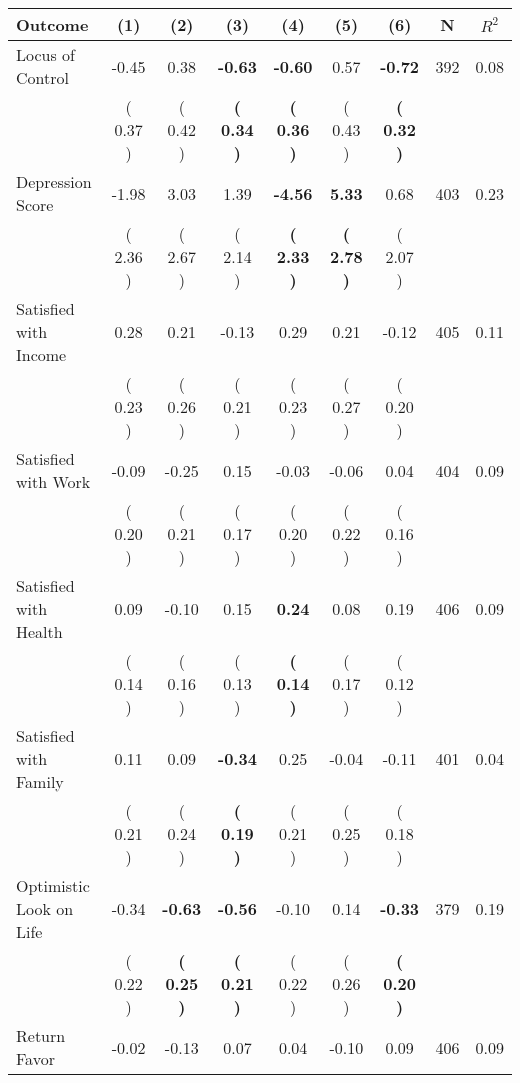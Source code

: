\begin{tabular}{lcccccccc}
\toprule
 \textbf{Outcome} & \textbf{(1)} & \textbf{(2)} & \textbf{(3)} & \textbf{(4)} & \textbf{(5)} & \textbf{(6)} & \textbf{N} & \textbf{$ R^2$} \\
\midrule
Locus of Control &     -0.45 &      0.38 & \textbf{    -0.63} & \textbf{    -0.60} &      0.57 & \textbf{    -0.72} & 392 &       0.08 \\ 
 & (     0.37 ) & (     0.42 ) & \textbf{(     0.34 )} & \textbf{(     0.36 )} & (     0.43 ) & \textbf{(     0.32 )} & \\
Depression Score &     -1.98 &      3.03 &      1.39 & \textbf{    -4.56} & \textbf{     5.33} &      0.68 & 403 &       0.23 \\ 
 & (     2.36 ) & (     2.67 ) & (     2.14 ) & \textbf{(     2.33 )} & \textbf{(     2.78 )} & (     2.07 ) & \\
Satisfied with Income &      0.28 &      0.21 &     -0.13 &      0.29 &      0.21 &     -0.12 & 405 &       0.11 \\ 
 & (     0.23 ) & (     0.26 ) & (     0.21 ) & (     0.23 ) & (     0.27 ) & (     0.20 ) & \\
Satisfied with Work &     -0.09 &     -0.25 &      0.15 &     -0.03 &     -0.06 &      0.04 & 404 &       0.09 \\ 
 & (     0.20 ) & (     0.21 ) & (     0.17 ) & (     0.20 ) & (     0.22 ) & (     0.16 ) & \\
Satisfied with Health &      0.09 &     -0.10 &      0.15 & \textbf{     0.24} &      0.08 &      0.19 & 406 &       0.09 \\ 
 & (     0.14 ) & (     0.16 ) & (     0.13 ) & \textbf{(     0.14 )} & (     0.17 ) & (     0.12 ) & \\
Satisfied with Family &      0.11 &      0.09 & \textbf{    -0.34} &      0.25 &     -0.04 &     -0.11 & 401 &       0.04 \\ 
 & (     0.21 ) & (     0.24 ) & \textbf{(     0.19 )} & (     0.21 ) & (     0.25 ) & (     0.18 ) & \\
Optimistic Look on Life &     -0.34 & \textbf{    -0.63} & \textbf{    -0.56} &     -0.10 &      0.14 & \textbf{    -0.33} & 379 &       0.19 \\ 
 & (     0.22 ) & \textbf{(     0.25 )} & \textbf{(     0.21 )} & (     0.22 ) & (     0.26 ) & \textbf{(     0.20 )} & \\
Return Favor &     -0.02 &     -0.13 &      0.07 &      0.04 &     -0.10 &      0.09 & 406 &       0.09 \\ 

\end{tabular}
